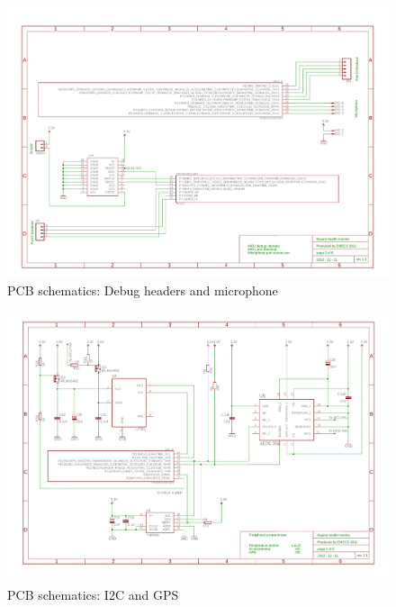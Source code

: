 \begin{figure}[htb]
\centering
\includegraphics[width=\columnwidth]{Images/pcb_debug_mic}
\caption{PCB schematics: Debug headers and microphone}
\label{fig:pcb_schematics_2}
\end{figure}

\begin{figure}[htb]
\centering
\includegraphics[width=\columnwidth]{Images/pcb_i2c_gps}
\caption{PCB schematics: I2C and GPS}
\label{fig:pcb_schematics_3}
\end{figure}

